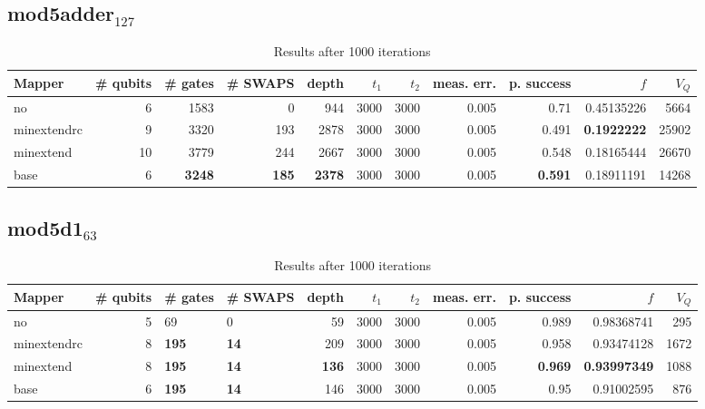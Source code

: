 \documentclass[11pt]{article}
\begin{document}
\subsection{mod5adder\(_{\text{127}}\)}
\label{sec:orge6dc12b}
\begin{table}[H]
\caption{\label{tab:org618aa93}
Results after 1000 iterations}
\centering
\small
\begin{tabular}{lrrrrrrrrrr}
\hline
Mapper & \# qubits & \# gates & \# SWAPS & depth & \(t_1\) & \(t_2\) & meas. err. & p. success & \(f\) & \(V_Q\)\\
\hline
no & 6 & 1583 & 0 & 944 & 3000 & 3000 & 0.005 & 0.71 & 0.45135226 & 5664\\
\hline
minextendrc & 9 & 3320 & 193 & 2878 & 3000 & 3000 & 0.005 & 0.491 & \textbf{0.1922222} & 25902\\
minextend & 10 & 3779 & 244 & 2667 & 3000 & 3000 & 0.005 & 0.548 & 0.18165444 & 26670\\
base & 6 & \textbf{3248} & \textbf{185} & \textbf{2378} & 3000 & 3000 & 0.005 & \textbf{0.591} & 0.18911191 & 14268\\
\hline
\end{tabular}
\end{table}
\subsection{mod5d1\(_{\text{63}}\)}
\label{sec:org5245ed8}
\begin{table}[H]
\caption{\label{tab:orge41d2f6}
Results after 1000 iterations}
\centering
\small
\begin{tabular}{lrllrrrrrrr}
\hline
Mapper & \# qubits & \# gates & \# SWAPS & depth & \(t_1\) & \(t_2\) & meas. err. & p. success & \(f\) & \(V_Q\)\\
\hline
no & 5 & 69 & 0 & 59 & 3000 & 3000 & 0.005 & 0.989 & 0.98368741 & 295\\
\hline
minextendrc & 8 & \textbf{195} & \textbf{14} & 209 & 3000 & 3000 & 0.005 & 0.958 & 0.93474128 & 1672\\
minextend & 8 & \textbf{195} & \textbf{14} & \textbf{136} & 3000 & 3000 & 0.005 & \textbf{0.969} & \textbf{0.93997349} & 1088\\
base & 6 & \textbf{195} & \textbf{14} & 146 & 3000 & 3000 & 0.005 & 0.95 & 0.91002595 & 876\\
\hline
\end{tabular}
\end{table}
\end{document}
